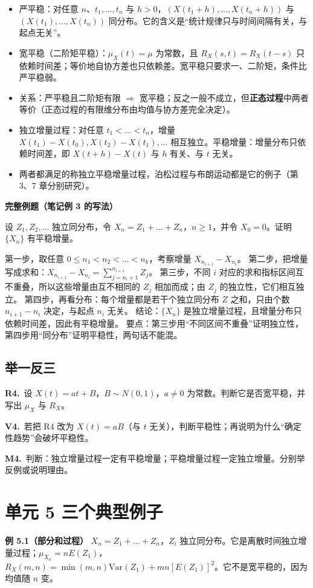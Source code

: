 \documentclass[UTF8,a4paper,11pt]{ctexart}
\newcommand{\PracticeQuestion}[3]{\par\Needspace{4\baselineskip}\noindent\begin{minipage}{\linewidth}\textbf{#1.}\ #2\par\noindent\rule{0pt}{#3mm}\par\end{minipage}\par}
\begin{document}
\begin{itemize}
\item 严平稳：对任意 $n$、$t_1,\dots,t_n$ 与 $h>0$，$(X(t_1+h),\dots,X(t_n+h))$ 与 $(X(t_1),\dots,X(t_n))$ 同分布。它的含义是“统计规律只与时间间隔有关，与起点无关”。
\item 宽平稳（二阶矩平稳）：$\mu_X(t)=\mu$ 为常数，且 $R_X(s,t)=R_X(t-s)$ 只依赖时间差；等价地自协方差也只依赖差。宽平稳只要求一、二阶矩，条件比严平稳弱。
\item 关系：严平稳且二阶矩有限 $\Rightarrow$ 宽平稳；反之一般不成立，但\textbf{正态过程}中两者等价（正态过程的有限维分布由均值与协方差完全决定）。
\item 独立增量过程：对任意 $t_1<\dots<t_n$，增量 $X(t_1)-X(t_0),X(t_2)-X(t_1),\dots$ 相互独立。平稳增量：增量分布只依赖时间差，即 $X(t+h)-X(t)$ 与 $h$ 有关、与 $t$ 无关。
\item 两者都满足的称独立平稳增量过程，泊松过程与布朗运动都是它的例子（第 3、7 章分别研究）。
\end{itemize}
\textbf{完整例题（笔记例 3 的写法）}

设 $Z_1,Z_2,\dots$ 独立同分布，令 $X_n=Z_1+\dots+Z_n$，$n\ge1$，并令 $X_0=0$。证明 $\{X_n\}$ 有平稳增量。

第一步，取任意 $0\le n_1<n_2<\dots<n_k$，考察增量 $X_{n_{i+1}}-X_{n_i}$。 第二步，把增量写成求和：$X_{n_{i+1}}-X_{n_i}=\sum_{j=n_i+1}^{n_{i+1}}Z_j$。 第三步，不同 $i$ 对应的求和指标区间互不重叠，所以这些增量由互不相同的 $Z_j$ 相加而成；由 $Z_j$ 的独立性，它们相互独立。 第四步，再看分布：每个增量都是若干个独立同分布 $Z$ 之和，只由个数 $n_{i+1}-n_i$ 决定，与起点 $n_i$ 无关。 结论：$\{X_n\}$ 是独立增量过程，且增量分布只依赖时间差，因此有平稳增量。 要点：第三步用“不同区间不重叠”证明独立性，第四步用“同分布”证明平稳性，两句话不能混。

\subsection{举一反三}
\PracticeQuestion{R4}{设 $X(t)=at+B$，$B\sim N(0,1)$，$a\ne0$ 为常数。判断它是否宽平稳，并写出 $\mu_X$ 与 $R_X$。}{42}
\PracticeQuestion{V4}{若把 R4 改为 $X(t)=aB$（与 $t$ 无关），判断平稳性；再说明为什么“确定性趋势”会破坏平稳性。}{40}
\PracticeQuestion{M4}{判断：独立增量过程一定有平稳增量；平稳增量过程一定独立增量。分别举反例或说明理由。}{38}
\clearpage
{}
\section{单元 5 三个典型例子}
\textbf{例 5.1（部分和过程）} $X_n=Z_1+\dots+Z_n$，$Z_i$ 独立同分布。它是离散时间独立增量过程；$\mu_{X_n}=nE(Z_1)$，$R_X(m,n)=\min(m,n)\mathrm{Var}(Z_1)+mn[E(Z_1)]^2$。它不是宽平稳的，因为均值随 $n$ 变。
\end{document}

